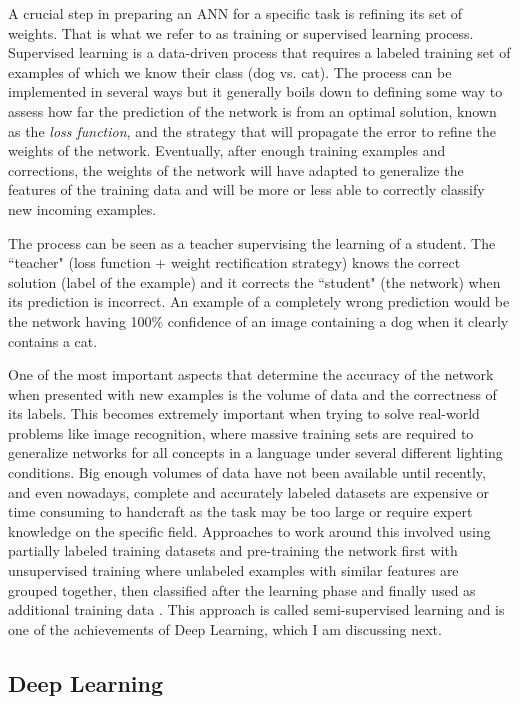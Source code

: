 A crucial step in preparing an ANN for a specific task is refining its set of weights.
That is what we refer to as training or supervised learning process.
Supervised learning is a data-driven process that requires a labeled training set of examples of which we know their class (dog vs. cat).
The process can be implemented in several ways but it generally boils down to defining some way to assess how far the prediction of the network is from an optimal solution, known as the \emph{loss function}, and the strategy that will propagate the error to refine the weights of the network.
Eventually, after enough training examples and corrections, the weights of the network will have adapted to generalize the features of the training data and will be more or less able to correctly classify new incoming examples.

The process can be seen as a teacher supervising the learning of a student.
The ``teacher" (loss function + weight rectification strategy) knows the correct solution (label of the example) and it corrects the ``student" (the network) when its prediction is incorrect.
An example of a completely wrong prediction would be the network having 100\% confidence of an image containing a dog when it clearly contains a cat.

One of the most important aspects that determine the accuracy of the network when presented with new examples is the volume of data and the correctness of its labels.
This becomes extremely important when trying to solve real-world problems like image recognition, where massive training sets are required to generalize networks for all concepts in a language under several different lighting conditions.
Big enough volumes of data have not been available until recently, and even nowadays, complete and accurately labeled datasets are expensive or time consuming to handcraft as the task may be too large or require expert knowledge on the specific field.
Approaches to work around this involved using partially labeled training datasets and pre-training the network first with unsupervised training where unlabeled examples with similar features are grouped together, then classified after the learning phase and finally used as additional training data \cite{Hinton2006}.
This approach is called semi-supervised learning and is one of the achievements of Deep Learning, which I am discussing next.


\subsection{Deep Learning}
\label{sub:theory:background:deep-learning}

